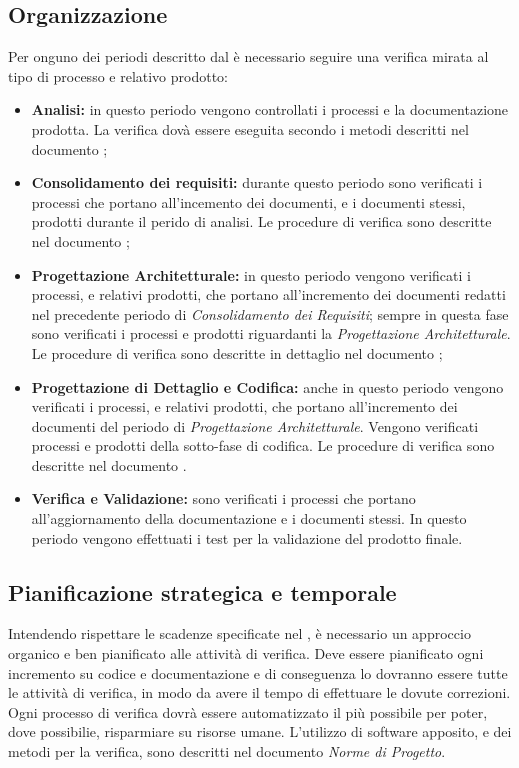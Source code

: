   \subsection{Organizzazione}
    Per onguno dei periodi descritto dal  è necessario seguire una verifica mirata al tipo di processo e relativo prodotto:
    \begin{itemize}
      \item \textbf{Analisi:} in questo periodo vengono controllati i processi e la documentazione prodotta.
      La verifica dovà essere eseguita secondo i metodi descritti nel documento ;
      \item \textbf{Consolidamento dei requisiti:} durante questo periodo sono verificati i processi che portano all'incemento dei documenti, e i documenti stessi, prodotti durante il perido di analisi.
      Le procedure di verifica sono descritte nel documento ;
      \item \textbf{Progettazione Architetturale:} in questo periodo vengono verificati i processi, e relativi prodotti, che portano all'incremento dei documenti redatti nel precedente periodo di \emph{Consolidamento dei Requisiti};
      sempre in questa fase sono verificati i processi e prodotti riguardanti la \emph{Progettazione Architetturale}.
      Le procedure di verifica sono descritte in dettaglio nel documento ;
      \item \textbf{Progettazione di Dettaglio e Codifica:} anche in questo periodo vengono verificati i processi, e relativi prodotti, che portano all'incremento dei documenti del periodo di \emph{Progettazione Architetturale}.
      Vengono verificati processi e prodotti della sotto-fase di codifica. Le procedure di verifica sono descritte nel documento .
      \item \textbf{Verifica e Validazione:} sono verificati i processi che portano all'aggiornamento della documentazione e i documenti stessi.
      In questo periodo vengono effettuati i test per la validazione del prodotto finale.
    \end{itemize}

  \subsection{Pianificazione strategica e temporale}
    Intendendo rispettare le scadenze specificate nel , è necessario un approccio organico e ben pianificato alle attività di verifica.
    Deve essere pianificato ogni incremento su codice e documentazione e di conseguenza lo dovranno essere tutte le attività di verifica,
    in modo da avere il tempo di effettuare le dovute correzioni. Ogni processo di verifica dovrà essere automatizzato il più possibile per poter, dove possibilie,
    risparmiare su risorse umane. L'utilizzo di software apposito, e dei metodi per la verifica, sono descritti nel documento \emph{Norme di Progetto}.

